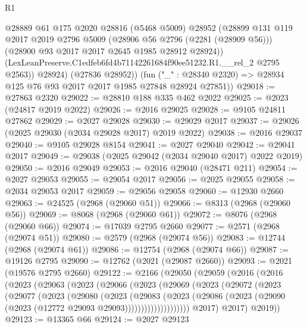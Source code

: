 \begin{lexlean}{R1}
\begin{coremodule}
            @28889
            @61
            @175
            @2020
            @28816
            (@5468 @5009)
            @28952
            (@28899
              @131
              @119
              @2017
              @2019
              @2796
              @5009
              (@28906 @56 @2796 (@2281 (@28909 @56)))
              (@28900 @93 @2017 @2017 @2645 @1985 @28912 @28924))
            (LexLeanPreserve.C1edfeb6fd4b71142261684f90ee51232.R1.__rel_2 @2795 @2563))
          @28924)
        (@27836 @28952))
      (fun ("_" : @28340 @2320) => @28934 @125 @76 @93 @2017 @2017 @1985 @27848 @28924 @27851))
@29018 := @27863 @2320
@29022 := @28810 @188 @335 @462 @2022
@29025 := @2023 (@24817 @2019 @2022)
@29026 := @2016 @29025
@29028 := @9105 @24811 @27862
@29029 := @2027 @29028
@29030 := @29029 @2017
@29037 := @29026 (@2025 @29030 (@2034 @29028 @2017) @2019 @2022)
@29038 := @2016 @29037
@29040 := @9105 @29028 @8154
@29041 := @2027 @29040
@29042 := @29041 @2017
@29049 := @29038 (@2025 @29042 (@2034 @29040 @2017) @2022 @2019)
@29050 := @2016 @29049
@29053 := @2016 @29040 (@28471 @211)
@29054 := @2027 @29053
@29055 := @29054 @2017
@29056 := @2025 @29055
@29058 := @2034 @29053 @2017
@29059 := @29056 @29058
@29060 := @12930 @2660
@29063 := @24525 (@2968 (@29060 @51))
@29066 := @8313 (@2968 (@29060 @56))
@29069 := @8068 (@2968 (@29060 @61))
@29072 := @8076 (@2968 (@29060 @66))
@29074 := @17039 @2795 @2660
@29077 := @2571 (@2968 (@29074 @51))
@29080 := @2579 (@2968 (@29074 @56))
@29083 := @12744 (@2968 (@29074 @61))
@29086 := @12754 (@2968 (@29074 @66))
@29087 := @19126 @2795
@29090 := @12762 (@2021 (@29087 @2660))
@29093 := @2021 (@19576 @2795 @2660)
@29122 := @2166
    (@29050
      (@29059
        (@2016
          (@2016
            (@2023
              (@29063
                (@2023
                  (@29066
                    (@2023
                      (@29069
                        (@2023
                          (@29072
                            (@2023
                              (@29077
                                (@2023
                                  (@29080
                                    (@2023
                                      (@29083
                                        (@2023
                                          (@29086
                                            (@2023
                                              (@29090
                                                (@2023 (@12772 @29093 @29093))))))))))))))))))))
            @2017)
          @2017)
        @2019))
@29123 := @13365 @66
@29124 := @2027 @29123

\end{coremodule}
\end{lexlean}

